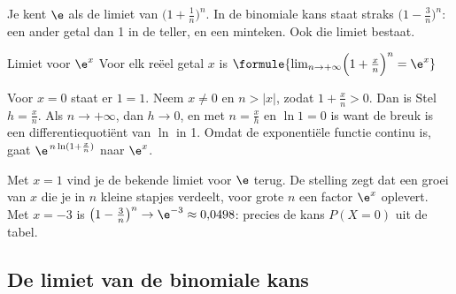 Je kent $\e$ als de limiet van $\bigl(1 + \frac1n\bigr)^n$. In de binomiale kans staat straks $\bigl(1 - \frac{3}{n}\bigr)^n$: een ander getal dan 1 in de teller, en een minteken. Ook die limiet bestaat.

\begin{theorie}
\begin{stelling}{Limiet voor $\e^x$}
Voor elk reëel getal $x$ is \quad $\formule{\lim_{n \to +\infty} \Bigl(1 + \frac{x}{n}\Bigr)^n = \e^x}$
\end{stelling}

\begin{bewijs}
Voor $x = 0$ staat er $1 = 1$. Neem $x \neq 0$ en $n > |x|$, zodat $1 + \frac{x}{n} > 0$. Dan is
Stel $h = \frac{x}{n}$. Als $n \to +\infty$, dan $h \to 0$, en met $n = \frac{x}{h}$ en $\ln 1 = 0$ is
want de breuk is een differentiequotiënt van $\ln$ in 1. Omdat de exponentiële functie continu is, gaat $\e^{\,n\ln(1 + \frac{x}{n})}$ naar $\e^x$.
\end{bewijs}
\end{theorie}

Met $x = 1$ vind je de bekende limiet voor $\e$ terug. De stelling zegt dat een groei van $x$ die je in $n$ kleine stapjes verdeelt, voor grote $n$ een factor $\e^x$ oplevert. Met $x = -3$ is $\bigl(1 - \frac{3}{n}\bigr)^n \to \e^{-3} \approx 0{,}0498$: precies de kans $P(X = 0)$ uit de tabel.


\begin{oefeningen}
\end{oefeningen}

\subsection{De limiet van de binomiale kans}

